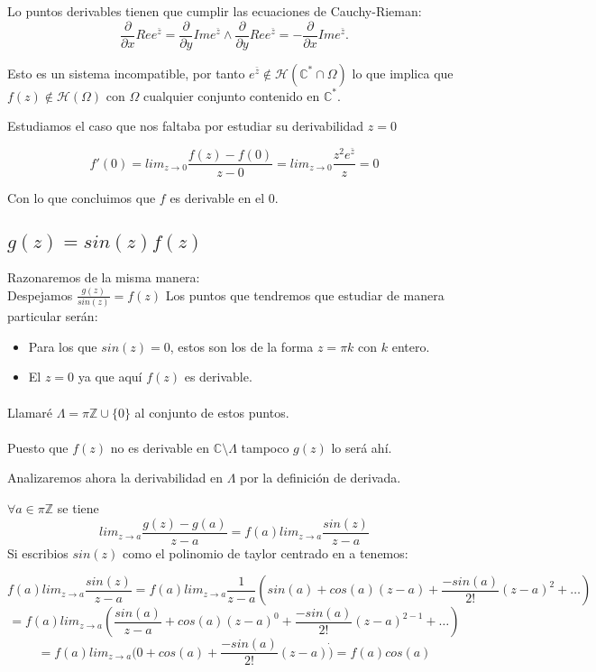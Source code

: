 \documentclass[12pt]{article}
\begin{document}
Lo puntos derivables tienen que cumplir las ecuaciones de Cauchy-Rieman:
$$\frac{\partial}{\partial x} Re e^{\bar z} = \frac{\partial}{\partial y} Im e^{\bar z} 
\wedge
\frac{\partial}{\partial y} Re e^{\bar z} = - \frac{\partial}{\partial x} Im e^{\bar z}.$$

Esto es un sistema incompatible, por tanto $e^{\bar z} \notin \mathcal H( \mathbb C^* \cap \Omega)$ 
lo que implica que $f(z) \notin \mathcal H(\Omega)$ con $\Omega$ cualquier conjunto contenido en $\mathbb C^*.$

Estudiamos el caso que nos faltaba por estudiar su derivabilidad $z=0$

$$f'(0) = lim_{z \rightarrow 0} \frac{f(z)-f(0)}{z-0} = lim_{z \rightarrow 0} \frac{z^2 e^{\bar z}}{z} = 0$$

Con lo que concluimos que $f$ es derivable en el 0.


\subsection{$g(z) = sin(z) f(z)$}
Razonaremos de la misma manera: \\
Despejamos $ \frac{g(z)}{sin(z)} = f(z)$
Los puntos que tendremos que estudiar de manera particular 
serán: 
\begin{itemize}
\item Para los que $sin(z) = 0$, estos son los de la forma $z = \pi k$ con $k$ entero.
\item El $z=0$ ya que aquí $f(z)$ es derivable. \paragraph{}
\end{itemize}
Llamaré $\Lambda = \pi\mathbb Z \cup \{0\}$ al conjunto de estos puntos. \paragraph{}

Puesto que $f(z)$ no es derivable en $\mathbb C \setminus \Lambda$
tampoco $g(z)$ lo será ahí. 

Analizaremos ahora la derivabilidad en $\Lambda$ por la definición de derivada. 

$\forall a \in \pi\mathbb Z$ se tiene 
$$lim_{z \longrightarrow a} \frac{g(z)-g(a)}{z-a} = f(a) lim_{z \longrightarrow a} \frac{sin(z)}{z-a}$$
Si escribios $sin(z)$ como el polinomio de taylor centrado en a tenemos: 

$$f(a) lim_{z \longrightarrow a} \frac{sin(z)}{z-a} = f(a) lim_{z \longrightarrow a}
\frac{1}{z-a} (sin(a) + cos(a)(z-a) + \frac{- sin(a)}{2!}(z-a)^2 +\dots )$$
 $$=f(a) lim_{z \longrightarrow a}
  (\frac{sin(a)}{z-a} + cos(a)(z-a)^0 + \frac{- sin(a)}{2!}(z-a)^{2-1} + \dots )$$
  $$=f(a) lim_{z \longrightarrow a}
  (0+ cos(a) + \frac{- sin(a)}{2!}(z-a)\dot )= f(a)cos(a)$$
\end{document}
